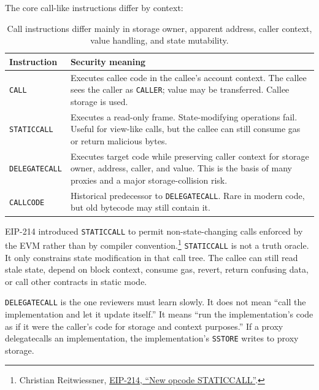 The core call-like instructions differ by context:

\begin{table}[htbp]
\centering
\small
\renewcommand{\arraystretch}{1.18}
\begin{tabularx}{\textwidth}{@{}>{\RaggedRight\arraybackslash}p{}X@{}}
\toprule
Instruction & Security meaning \\
\midrule
\texttt{CALL} & Executes callee code in the callee's account context. The callee sees the caller as \texttt{CALLER}; value may be transferred. Callee storage is used. \\
\texttt{STATICCALL} & Executes a read-only frame. State-modifying operations fail. Useful for view-like calls, but the callee can still consume gas or return malicious bytes. \\
\texttt{DELEGATECALL} & Executes target code while preserving caller context for storage owner, address, caller, and value. This is the basis of many proxies and a major storage-collision risk. \\
\texttt{CALLCODE} & Historical predecessor to \texttt{DELEGATECALL}. Rare in modern code, but old bytecode may still contain it. \\
\bottomrule
\end{tabularx}
\caption{Call instructions differ mainly in storage owner, apparent address, caller context, value handling, and state mutability.}
\end{table}

EIP-214 introduced \texttt{STATICCALL} to permit non-state-changing calls enforced by the EVM rather than by compiler convention.\footnote{Christian Reitwiessner, \href{https://eips.ethereum.org/EIPS/eip-214}{EIP-214, ``New opcode STATICCALL''}.} \texttt{STATICCALL} is not a truth oracle. It only constrains state modification in that call tree. The callee can still read stale state, depend on block context, consume gas, revert, return confusing data, or call other contracts in static mode.

\texttt{DELEGATECALL} is the one reviewers must learn slowly. It does not mean ``call the implementation and let it update itself.'' It means ``run the implementation's code as if it were the caller's code for storage and context purposes.'' If a proxy delegatecalls an implementation, the implementation's \texttt{SSTORE} writes to proxy storage.

